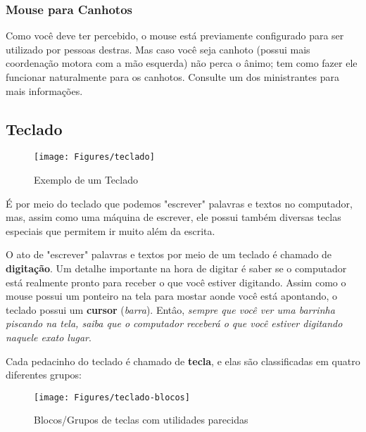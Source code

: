 \documentclass[hidelinks,12pt]{article}
\begin{document}
\subsubsection{Mouse para Canhotos}

Como você deve ter percebido, o mouse está previamente configurado para ser utilizado por pessoas destras. Mas caso você seja canhoto (possui mais coordenação motora com a mão esquerda) não perca o ânimo; tem como fazer ele funcionar naturalmente para os canhotos. Consulte um dos ministrantes para mais informações.

\subsection{Teclado}

\begin{figure}[!h]
        \centering
		\texttt{[image: Figures/teclado]}
		\label{fig:teclado}
		\caption{Exemplo de um Teclado}
\end{figure}

É por meio do teclado que podemos "escrever" palavras e textos no computador, mas, assim como uma máquina de escrever, ele possui também diversas teclas especiais que permitem ir muito além da escrita. 

O ato de "escrever" palavras e textos por meio de um teclado é chamado de \textbf{digitação}. Um detalhe importante na hora de digitar é saber se o computador está realmente pronto para receber o que você estiver digitando. Assim como o mouse possui um ponteiro na tela para mostar aonde você está apontando, o teclado possui um \textbf{cursor} (\emph{barra}). Entâo, \emph{sempre que você ver uma barrinha piscando na tela, saiba que o computador receberá o que você estiver digitando naquele exato lugar}.

Cada pedacinho do teclado é chamado de \textbf{tecla}, e elas são classificadas em quatro diferentes grupos:

\begin{figure}[!h]
        \centering
		\texttt{[image: Figures/teclado-blocos]}
		\label{fig:teclado-blocos}
		\caption{Blocos/Grupos de teclas com utilidades parecidas}
\end{figure}
\end{document}
